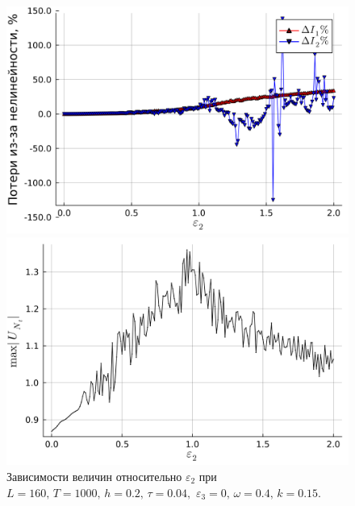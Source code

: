 \documentclass[14pt,a4paper]{extreport}
\begin{document}
			\begin{figure}[H] %
				\begin{center}
					\begin{minipage}[h]{0.48\linewidth}
						\includegraphics[width=1\linewidth]{fig78.png}
					\end{minipage}
					\hfill
					\begin{minipage}[h]{0.48\linewidth}
						\includegraphics[width=1\linewidth]{fig79.png}
					\end{minipage}
				\end{center}
				\caption{Зависимости величин относительно \(\varepsilon_{2}\) при
				\(L=160,\, T=1000,\, h=0.2,\, \tau=0.04,\)
				\(\varepsilon_{3}=0,\, \omega=0.4,\, k=0.15\).}
				\label{fig340-5_4}
			\end{figure}
\end{document}
